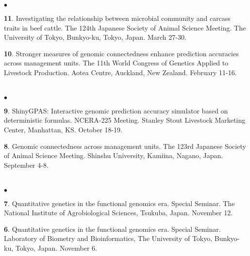 \documentclass[margin,line,10pt]{res}
\newenvironment{list2}{
  \begin{list}{$\bullet$}{%
      \setlength{\itemsep}{0in}
      \setlength{\parsep}{0in} \setlength{\parskip}{0in}
      \setlength{\topsep}{0in} \setlength{\partopsep}{0in} 
      \setlength{\leftmargin}{0.2in}}}{\end{list}}
\begin{document}
\begin{resume}
\begin{list2}
  
  \item [{\bf 11}.] Investigating the relationship between microbial community and carcass traits in beef cattle.  The 124th Japanese Society of Animal Science Meeting. The University of Tokyo, Bunkyo-ku, Tokyo, Japan. March 27-30.

    
    \vspace{0.5cm}

          
\item [{\bf 10}.] Stronger measures of genomic connectedness enhance prediction accuracies across management units. The 11th World Congress of Genetics Applied to Livestock Production.  Aotea Centre, Auckland, New Zealand. February 11-16. 

\end{list2}  





\section{}
\begin{list2}

  \item [{\bf 9}.] ShinyGPAS: Interactive genomic prediction accuracy simulator based on deterministic formulas. NCERA-225 Meeting. Stanley Stout Livestock Marketing Center, Manhattan, KS. October 18-19. 

      \vspace{0.5cm}

  \item [{\bf 8}.] Genomic connectedness across management units. The 123rd Japanese Society of Animal Science Meeting. Shinshu University, Kamiina, Nagano, Japan. September 4-8.

\end{list2}  

    
\section{}
\begin{list2}

  \item [{\bf 7}.] Quantitative genetics in the functional genomics era. Special Seminar. The National Institute of Agrobiological Sciences, Tsukuba, Japan. November 12. 

  \vspace{0.5cm}

\item [{\bf 6}.] Quantitative genetics in the functional genomics era. Special Seminar. Laboratory of Biometry and Bioinformatics, The University of Tokyo, Bunkyo-ku, Tokyo, Japan. November 6. 


\end{list2}
\end{resume}
\end{document}
